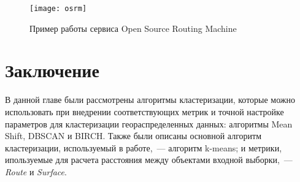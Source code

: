 \begin{figure}[ht!]
    \centering
    \texttt{[image: osrm]}\\[1ex]
    \parbox{.9\textwidth}{\caption{Пример работы сервиса Open Source Routing Machine}\label{pic:osrm}}
\end{figure}

\section{Заключение}
В данной главе были рассмотрены алгоритмы кластеризации, которые можно использовать при внедрении соответствующих метрик и точной настройке параметров для кластеризации геораспределенных данных: алгоритмы Mean Shift, DBSCAN и BIRCH. Также были описаны основной алгоритм кластеризации, используемый в работе,~--- алгоритм k-means; и метрики, ипользуемые для расчета расстояния между объектами входной выборки,~--- \emph{Route} и \emph{Surface}.
